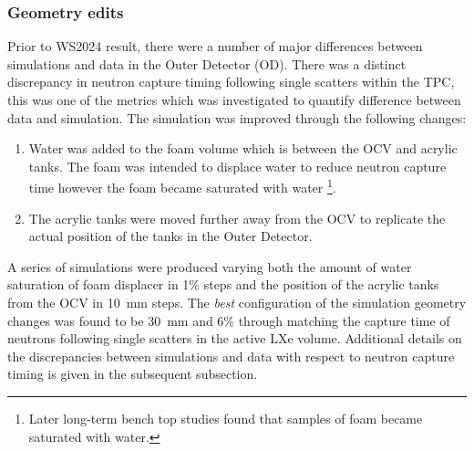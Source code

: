 \subsubsection{Geometry edits}\label{sec:VetoEff/GeometryEdits}
Prior to WS2024 result, there were a number of major differences between simulations and data in the Outer Detector (OD).
There was a distinct discrepancy in neutron capture timing following single scatters within the TPC, this was one of the metrics which was investigated to quantify difference between data and simulation.
The simulation was improved through the following changes:
\begin{enumerate}
	\item Water was added to the foam volume which is between the OCV and acrylic tanks. The foam was intended to displace water to reduce neutron capture time however the foam became saturated with water \footnote{Later long-term bench top studies found that samples of foam became saturated with water.}.
	\item The acrylic tanks were moved further away from the OCV to replicate the actual position of the tanks in the Outer Detector.
\end{enumerate}
A series of simulations were produced varying both the amount of water saturation of foam displacer in 1\% steps and the position of the acrylic tanks from the OCV in 10~mm steps. The \textit{best} configuration of the simulation geometry changes was found to be 30~mm and 6\% through matching the capture time of neutrons following single scatters in the active LXe volume. Additional details on the discrepancies between simulations and data with respect to neutron capture timing is given in the subsequent subsection.
